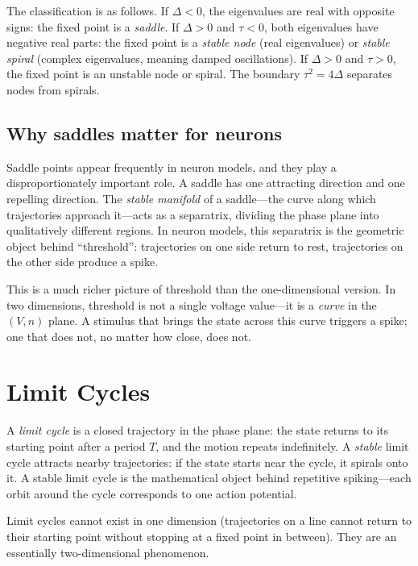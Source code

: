 \noindent The classification is as follows. If $\Delta < 0$, the eigenvalues are real with opposite signs: the fixed point is a \emph{saddle}. If $\Delta > 0$ and $\tau < 0$, both eigenvalues have negative real parts: the fixed point is a \emph{stable node} (real eigenvalues) or \emph{stable spiral} (complex eigenvalues, meaning damped oscillations). If $\Delta > 0$ and $\tau > 0$, the fixed point is an unstable node or spiral. The boundary $\tau^2 = 4\Delta$ separates nodes from spirals.

\subsection{Why saddles matter for neurons}

Saddle points appear frequently in neuron models, and they play a disproportionately important role. A saddle has one attracting direction and one repelling direction. The \emph{stable manifold} of a saddle---the curve along which trajectories approach it---acts as a separatrix, dividing the phase plane into qualitatively different regions. In neuron models, this separatrix is the geometric object behind ``threshold'': trajectories on one side return to rest, trajectories on the other side produce a spike.

This is a much richer picture of threshold than the one-dimensional version. In two dimensions, threshold is not a single voltage value---it is a \emph{curve} in the $(V, n)$ plane. A stimulus that brings the state across this curve triggers a spike; one that does not, no matter how close, does not.

\section{Limit Cycles}
\label{sec:limit-cycles}

A \emph{limit cycle} is a closed trajectory in the phase plane: the state returns to its starting point after a period $T$, and the motion repeats indefinitely. A \emph{stable} limit cycle attracts nearby trajectories: if the state starts near the cycle, it spirals onto it. A stable limit cycle is the mathematical object behind repetitive spiking---each orbit around the cycle corresponds to one action potential.

Limit cycles cannot exist in one dimension (trajectories on a line cannot return to their starting point without stopping at a fixed point in between). They are an essentially two-dimensional phenomenon.

